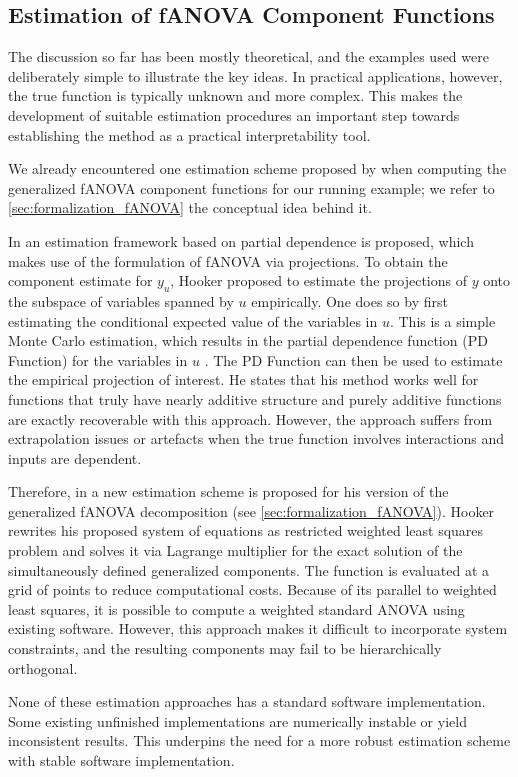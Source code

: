\subsection{Estimation of fANOVA Component Functions}
The discussion so far has been mostly theoretical, and the examples used were 
deliberately simple to illustrate the key ideas. 
In practical applications, however, the true function is typically unknown and 
more complex. 
This makes the development of suitable estimation procedures an important step 
towards establishing the method as a practical interpretability tool.

We already encountered one estimation scheme proposed by \cite{rahman2014} when computing the generalized fANOVA component functions for our running example; we refer to \autoref{sec:formalization_fANOVA} the conceptual idea behind it.

In \cite{hooker2004} an estimation framework based on partial dependence is proposed, which makes use of the formulation of fANOVA via projections. To obtain the component estimate for $y_u$, Hooker proposed to estimate the projections of $y$ onto the subspace of variables spanned by $u$ empirically.
One does so by first estimating the conditional expected value of the variables in $u$. %
This is a simple Monte Carlo estimation, which results in the partial dependence function (PD Function) for the variables in $u$ \citep{hooker2004}.
The PD Function can then be used to estimate the empirical projection of interest. He states that his method works well for functions that truly have nearly additive structure and purely additive functions are exactly recoverable with this approach. However, the approach suffers from extrapolation issues or artefacts when the true function involves interactions and inputs are dependent.\par

Therefore, in \cite{hooker2007} a new estimation scheme is proposed for his version of the generalized fANOVA decomposition (see \autoref{sec:formalization_fANOVA}).
Hooker rewrites his proposed system of equations as restricted weighted least squares problem and solves it via Lagrange multiplier for the exact solution of the simultaneously defined generalized components.
The function is evaluated at a grid of points to reduce computational costs.
Because of its parallel to weighted least squares, it is possible to compute a weighted standard ANOVA using existing software. However, this approach makes it difficult to incorporate system constraints, and the resulting components may fail to be hierarchically orthogonal.\par

None of these estimation approaches has a standard software implementation.
Some existing unfinished implementations are numerically instable or yield inconsistent results. This underpins the need for a more robust estimation scheme with stable software implementation.
